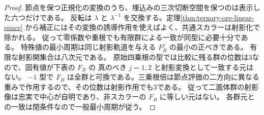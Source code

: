 \begin{proof}
節点を保つ正規化の変換のうち、埋込みの三次切断空間を保つのは表示した六つだけである。
反転は $\lambda$ と $\lambda^{-1}$ を交換する。定理\ref{thm:ternary-ore-linear-space}
から補正にはその変換の誘導作用を使えばよく、共通スカラーは射影化で除かれる。
従って零係数や重根でも有限群による一致が同型に必要十分である。
特殊値の最小周期は同じ射影軌道を与える $F_B^j$ の最小の正べきである。
有限な射影開集合は八次元である。
原始四乗根の型では比較に残る群の位数は3なので、固有値が下表の $F_B$ の
真のべき $j=1,2$ と射影変換として一致する元はない。
$-1$ 型で $F_B$ は全群と可換である。三乗根倍は節点評価の二方向に異なる
重みで作用するので、その位数は射影作用でも3である。
従って二面体群の射影像は忠実で中心が自明であり、非スカラーの $F_B$ に等しい元はない。
各群元との一致は閉条件なので一般最小周期が従う。
\end{proof}

